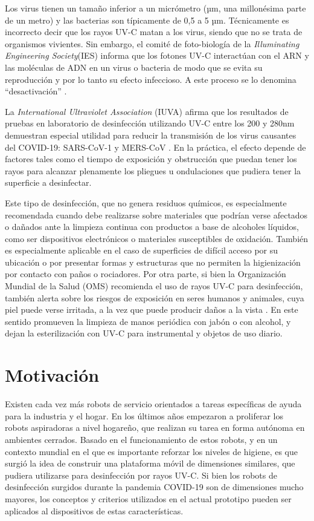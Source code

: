 Los virus tienen un tamaño inferior a un micrómetro (µm, una millonésima parte de un metro) y las bacterias son típicamente de 0,5 a 5 µm. Técnicamente es incorrecto decir que los rayos  UV-C matan a los virus, siendo que no se trata de organismos vivientes. Sin embargo, el comité de foto-biología de la \emph{ Illuminating Engineering Society}(IES) informa que los fotones UV-C interactúan con el ARN y las moléculas de ADN en un virus o bacteria de modo que se evita su reproducción y por lo tanto su efecto infeccioso. A este proceso se lo denomina “desactivación”  \citep{IES}.

La \emph{International Ultraviolet Association}  (IUVA) afirma que los resultados de pruebas en laboratorio de desinfección utilizando UV-C entre los 200 y 280nm demuestran especial utilidad para reducir la transmisión de los virus causantes del COVID-19:  SARS-CoV-1 y MERS-CoV \citep{IUA}. En la práctica, el efecto depende de factores tales como  el tiempo de exposición y obstrucción que puedan tener los rayos para alcanzar plenamente los pliegues u ondulaciones que pudiera tener la superficie a desinfectar. 

Este tipo de desinfección, que no genera residuos químicos, es especialmente recomendada cuando debe realizarse sobre materiales que podrían verse afectados o dañados ante la limpieza continua con productos a base de alcoholes líquidos, como ser dispositivos electrónicos o materiales susceptibles de oxidación. También es especialmente aplicable en el caso de superficies de difícil acceso por su ubicación o por presentar formas y estructuras que no permiten la higienización por contacto con paños o rociadores. 
Por otra parte, si bien la Organización Mundial de la Salud (OMS) recomienda el uso de rayos UV-C para desinfección, también alerta sobre los riesgos de  exposición en seres humanos y animales, cuya piel puede verse irritada, a la vez que puede producir daños a la vista \citep{MYTH}. En este sentido promueven la limpieza de manos periódica con jabón o con alcohol, y dejan la esterilización con UV-C para  instrumental y objetos de uso diario.





\section{Motivación}

Existen cada vez más robots de servicio orientados a tareas específicas de ayuda para la industria y el hogar. En los últimos años empezaron a proliferar los robots aspiradoras a nivel hogareño, que realizan su tarea en forma autónoma en ambientes cerrados. 
Basado en el funcionamiento de estos robots, y en un contexto mundial en el que es importante reforzar los niveles de higiene, es que surgió la idea de construir una plataforma móvil de dimensiones similares, que pudiera utilizarse para desinfección por rayos UV-C. 
Si bien los robots de desinfección surgidos durante la pandemia COVID-19 son de dimensiones mucho mayores, los conceptos y criterios utilizados en el actual prototipo pueden ser aplicados al dispositivos de estas características.

